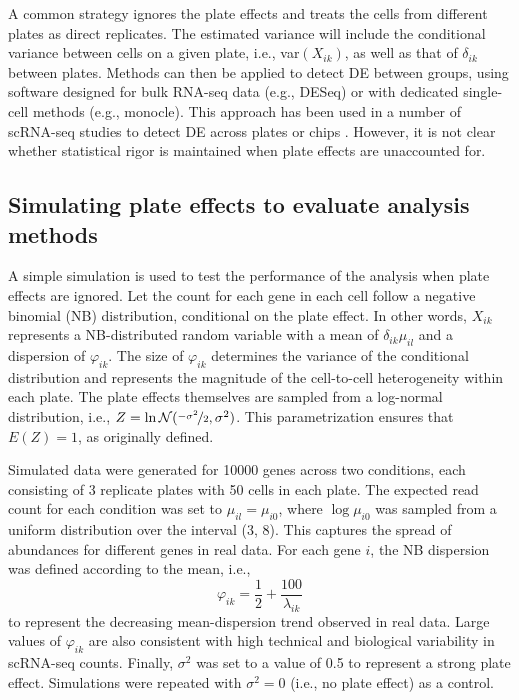 \documentclass{article}
\begin{document}
A common strategy ignores the plate effects and treats the cells from different plates as direct replicates.
The estimated variance will include the conditional variance between cells on a given plate, i.e., var$(X_{ik})$, as well as that of $\delta_{ik}$ between plates.
Methods can then be applied to detect DE between groups, using software designed for bulk RNA-seq data (e.g., DESeq) or with dedicated single-cell methods (e.g., monocle).
This approach has been used in a number of scRNA-seq studies to detect DE across plates or chips \cite{kolod2015single,trapnell2014dynamics,avraham2015pathogen}.
However, it is not clear whether statistical rigor is maintained when plate effects are unaccounted for.


\subsection{Simulating plate effects to evaluate analysis methods}
A simple simulation is used to test the performance of the analysis when plate effects are ignored.
Let the count for each gene in each cell follow a negative binomial (NB) distribution, conditional on the plate effect.
In other words, $X_{ik}$ represents a NB-distributed random variable with a mean of $\delta_{ik}\mu_{il}$ and a dispersion of $\varphi_{ik}$.
The size of $\varphi_{ik}$ determines the variance of the conditional distribution and represents the magnitude of the cell-to-cell heterogeneity within each plate.
The plate effects themselves are sampled from a log-normal distribution, i.e., $Z = \ln \mathcal{N}(\nicefrac{-\sigma^2}{2}, \sigma^2)$.
This parametrization ensures that $E(Z)=1$, as originally defined.

Simulated data were generated for 10000 genes across two conditions, each consisting of 3 replicate plates with 50 cells in each plate.
The expected read count for each condition was set to $\mu_{il}=\mu_{i0}$, where $\log \mu_{i0}$ was sampled from a uniform distribution over the interval (3, 8).
This captures the spread of abundances for different genes in real data. 
For each gene $i$, the NB dispersion was defined according to the mean, i.e., 
\[
    \varphi_{ik} = \frac{1}{2} + \frac{100}{\lambda_{ik}} 
\]
to represent the decreasing mean-dispersion trend observed in real data.
Large values of $\varphi_{ik}$ are also consistent with high technical and biological variability in scRNA-seq counts.
Finally, $\sigma^2$ was set to a value of 0.5 to represent a strong plate effect.
Simulations were repeated with $\sigma^2=0$ (i.e., no plate effect) as a control. 
\end{document}
